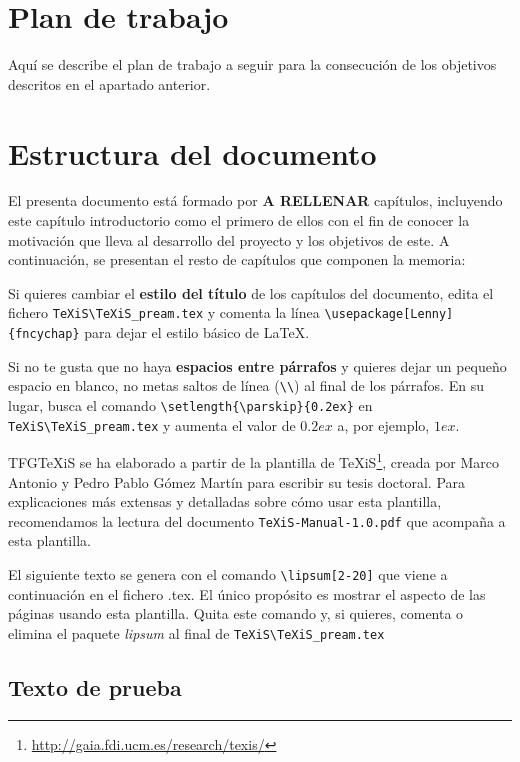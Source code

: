 \section{Plan de trabajo}
Aquí se describe el plan de trabajo a seguir para la consecución de los objetivos descritos en el apartado anterior.



\section{Estructura del documento}
El presenta documento está formado por  \textbf{A RELLENAR}  capítulos, incluyendo este capítulo introductorio como el primero de ellos con el fin de conocer la motivación que lleva al desarrollo del proyecto y los objetivos de este. A continuación, se presentan el resto de capítulos que componen la memoria: 

Si quieres cambiar el \textbf{estilo del título} de los capítulos del documento, edita el fichero \verb|TeXiS\TeXiS_pream.tex| y comenta la línea \verb|\usepackage[Lenny]{fncychap}| para dejar el estilo básico de \LaTeX.

Si no te gusta que no haya \textbf{espacios entre párrafos} y quieres dejar un pequeño espacio en blanco, no metas saltos de línea (\verb|\\|) al final de los párrafos. En su lugar, busca el comando  \verb|\setlength{\parskip}{0.2ex}| en \verb|TeXiS\TeXiS_pream.tex| y aumenta el valor de $0.2ex$ a, por ejemplo, $1ex$.

TFGTeXiS se ha elaborado a partir de la plantilla de TeXiS\footnote{\url{http://gaia.fdi.ucm.es/research/texis/}}, creada por Marco Antonio y Pedro Pablo Gómez Martín para escribir su tesis doctoral. Para explicaciones más extensas y detalladas sobre cómo usar esta plantilla, recomendamos la lectura del documento \texttt{TeXiS-Manual-1.0.pdf} que acompaña a esta plantilla.

El siguiente texto se genera con el comando \verb|\lipsum[2-20]| que viene a continuación en el fichero .tex. El único propósito es mostrar el aspecto de las páginas usando esta plantilla. Quita este comando y, si quieres, comenta o elimina el paquete \textit{lipsum} al final de \verb|TeXiS\TeXiS_pream.tex|

\subsection{Texto de prueba}


\lipsum[2-20]